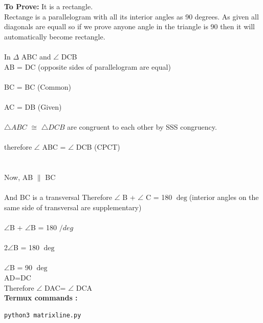 \documentclass[10pt, a4paper]{article}
\begin{document}
\textbf{To Prove:} It is a rectangle.\\
Rectange is a parallelogram with all its interior angles as 90 degrees. As given all diagonals are equall so if we prove anyone angle in the triangle is 90 then it will automatically become rectangle.\\
\\
In $\Delta$ ABC and $\angle$ DCB   \\
AB = DC (opposite sides of parallelogram are equal) \\
\\
 BC = BC (Common)\\
   \\
   AC = DB (Given)\\
 \\ 
$\triangle ABC$ $\cong$ $\triangle DCB$ are congruent to each other by SSS congruency.  \\
 \\ 
 therefore $\angle$ ABC = $\angle$ DCB (CPCT)\\
 \\
 \\
Now,
 AB $\parallel$ BC \\
 \\
 And BC is a transversal
 Therefore $\angle$ B + $\angle$ C = 180 $\deg$(interior angles on the same side of transversal are supplementary)\\
 \\
 $\angle$B + $\angle$B = 180 $/deg$\\
 \\
  2$\angle$B = 180 $\deg$\\
 \\
 $\angle$B = 90 $\deg$\\
 AD=DC \\
 
 Therefore $\angle$ DAC= $\angle$ DCA\\
 
\vspace{1mm}
\textbf{Termux commands :}
\begin{lstlisting}
python3 matrixline.py
\end{lstlisting}
\end{document}
